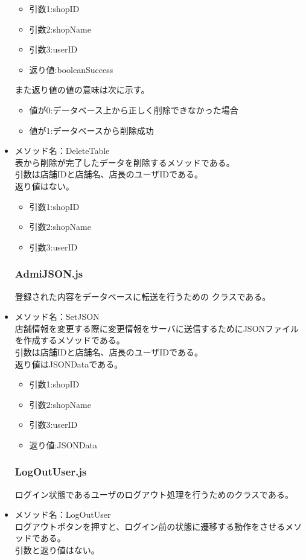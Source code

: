 \documentclass[a4j]{jarticle}
\begin{document}
\begin{itemize}
	\begin{itemize}
		\item 引数1:shopID
		\item 引数2:shopName
		\item 引数3:userID
		\item 返り値:booleanSuccess
	\end{itemize}
また返り値の値の意味は次に示す。
	\begin{itemize}
		\item 値が0:データベース上から正しく削除できなかった場合
		\item 値が1:データベースから削除成功
	\end{itemize}

\item メソッド名：DeleteTable\\

表から削除が完了したデータを削除するメソッドである。\\
引数は店舗IDと店舗名、店長のユーザIDである。\\
返り値はない。
	\begin{itemize}
		\item 引数1:shopID
		\item 引数2:shopName
		\item 引数3:userID
	\end{itemize}
\subsubsection{AdmiJSON.js}
登録された内容をデータベースに転送を行うための
クラスである。

\item メソッド名：SetJSON\\

店舗情報を変更する際に変更情報をサーバに送信するためにJSONファイルを作成するメソッドである。\\
引数は店舗IDと店舗名、店長のユーザIDである。\\
返り値はJSONDataである。
	\begin{itemize}
		\item 引数1:shopID
		\item 引数2:shopName
		\item 引数3:userID
		\item 返り値:JSONData
	\end{itemize}
\subsubsection{LogOutUser.js}
ログイン状態であるユーザのログアウト処理を行うためのクラスである。
%
\item メソッド名：LogOutUser\\
ログアウトボタンを押すと、ログイン前の状態に遷移する動作をさせるメソッドである。\\
引数と返り値はない。
%

\end{itemize}
\end{document}
